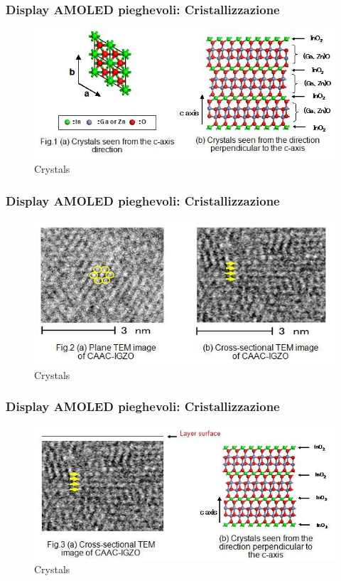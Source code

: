 \documentclass[12pt]{beamer}
\begin{document}
	\begin{frame}
		\frametitle{Display AMOLED pieghevoli: Cristallizzazione}
		\begin{figure}
			\centering
			\includegraphics[width=1\linewidth]{"IMMAGINI/Cristalizzazione CAAS"}
			\caption{Crystals}
			\label{fig:cristalizzazione-caas}
		\end{figure}
	\end{frame}
	\begin{frame}
		\frametitle{Display AMOLED pieghevoli: Cristallizzazione}
		\begin{figure}
			\centering
			\includegraphics[width=1\linewidth]{IMMAGINI/immagine_cristalizzazione}
			\caption{Crystals}
			\label{fig:immaginecristalizzazione}
		\end{figure}
	\end{frame}
	\begin{frame}
		\frametitle{Display AMOLED pieghevoli: Cristallizzazione}
		\begin{figure}
			\centering
			\includegraphics[width=1\linewidth]{IMMAGINI/immagine_cristalizzazione_CAAS}
			\caption{Crystals}
			\label{fig:immaginecristalizzazionecaas}
		\end{figure}
	\end{frame}
\end{document}
